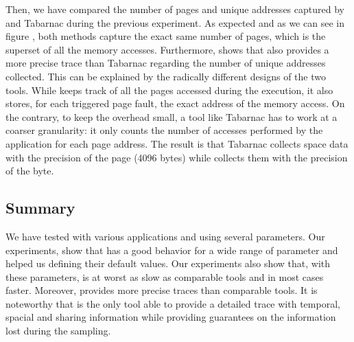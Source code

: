 Then, we have compared the number of pages and unique addresses captured by \Moca
and Tabarnac during the previous experiment. As expected and as we can see in figure
, both methods capture the exact same number of
pages, which is the superset of all the memory accesses. Furthermore,
 shows that \Moca also provides a more precise trace than Tabarnac
regarding the number of unique addresses collected. This can be explained by the 
radically different designs of the two tools. While \Moca keeps track of all
the pages accessed during the execution, it also stores, for each triggered page fault, the
exact address of the memory access. On the contrary, to keep the overhead small,
a tool like Tabarnac has to work at a coarser granularity: it only counts the number
of accesses performed by the application for each page address. The result is that Tabarnac
collects space data with the precision of the page (4096 bytes) while \Moca collects them with
the precision of the byte.

\subsection{Summary}
\label{sec:expe-cncl}

We have tested \Moca with various applications and using several parameters.
Our experiments, show that \Moca has a good behavior for a wide range of parameter and
helped us defining their default values. Our experiments also show that, with these
parameters, \Moca is at worst as slow as comparable tools and in most 
cases faster. Moreover, \Moca provides more precise traces than comparable tools.
It is noteworthy that \Moca is the only tool able to provide a detailed trace with temporal,
spacial and sharing information while providing guarantees on the information
lost during the sampling.
